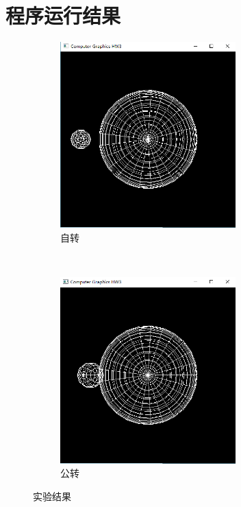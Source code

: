 \documentclass[hyperref, UTF8]{ctexart}
\begin{document}
	\section{程序运行结果}
	\begin{figure}[H]
		\centering
		\begin{subfigure}{0.45\textwidth}
			\includegraphics[width=192pt]{../results/rotation.png}
			\caption{自转}
		\end{subfigure}
		~
		\begin{subfigure}{0.45\textwidth}
			\includegraphics[width=192pt]{../results/revolution.png}
			\caption{公转}
		\end{subfigure}
		\caption{实验结果}
	\end{figure}
\end{document}
